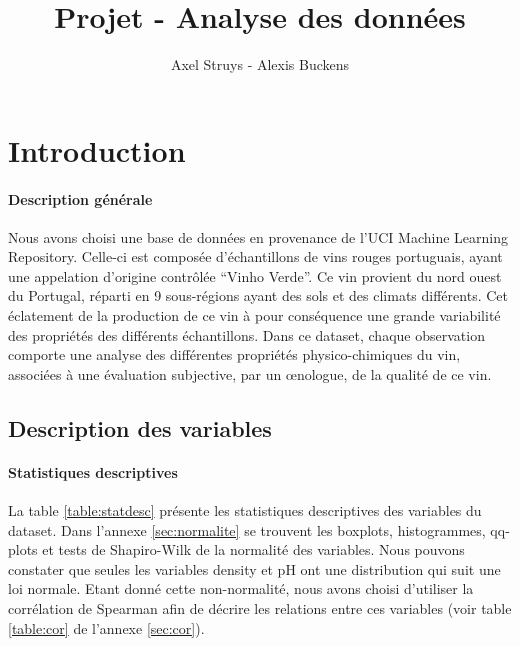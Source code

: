 \documentclass[11pt,a4paper]{article}
\author{Axel Struys - Alexis Buckens}
\title{Projet - Analyse des données}
\begin{document}
\maketitle

\section{Introduction}
\paragraph{Description générale}
Nous avons choisi une base de données en provenance de l'UCI Machine Learning Repository. Celle-ci est composée d'échantillons de vins rouges portuguais, ayant une appelation d'origine contrôlée ``Vinho Verde''. Ce vin provient du nord ouest du Portugal, réparti en 9 sous-régions ayant des sols et des climats différents. Cet éclatement de la production de ce vin à pour conséquence une grande variabilité des propriétés des différents échantillons. Dans ce dataset, chaque observation comporte une analyse des différentes propriétés physico-chimiques du vin, associées à une évaluation subjective, par un \oe nologue, de la qualité de ce vin.

\subsection{Description des variables}
\paragraph{Statistiques descriptives}
La table \ref{table:statdesc} présente les statistiques descriptives des variables du dataset.
Dans l'annexe \ref{sec:normalite} se trouvent les boxplots, histogrammes, qq-plots et tests de Shapiro-Wilk de la normalité des variables. Nous pouvons constater que seules les variables density et pH ont une distribution qui suit une loi normale. Etant donné cette non-normalité, nous avons choisi d'utiliser la corrélation de Spearman afin de décrire les relations entre ces variables (voir table \ref{table:cor} de l'annexe \ref{sec:cor}).
\end{document}
